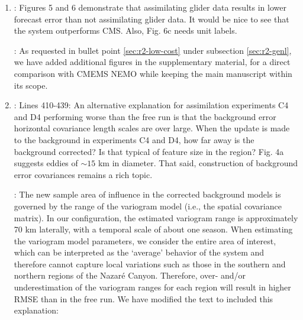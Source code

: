 \documentclass[a4paper]{article}
\begin{document}
\begin{answers}
\begin{enumerate}
\item

  \reply: Figures 5 and 6 demonstrate that assimilating glider data
  results in lower forecast error than not assimilating glider
  data. It would be nice to see that the system outperforms CMS. Also,
  Fig. 6c needs unit labels.

  \action: As requested in bullet point \ref{sec:r2-low-cost} under
  subsection \ref{sec:r2-genl}, we have added additional figures in
  the supplementary material, for a direct comparison with CMEMS NEMO
  while keeping the main manuscript within its scope.


\item\label{sec:r2-assim}

  \reply: Lines 410-439: An alternative explanation for assimilation
  experiments C4 and D4 performing worse than the free run is that the
  background error horizontal covariance length scales are over large.
  When the update is made to the background in experiments C4 and D4,
  how far away is the background corrected? Is that typical of feature
  size in the region? Fig. 4a suggests eddies of $\sim 15$ km in diameter.
  That said, construction of background error covariances remains a
  rich topic.

  \action: The new sample area of influence in the corrected
  background models is governed by the range of the variogram model
  (i.e., the spatial covariance matrix). In our configuration, the
  estimated variogram range is approximately 70 km laterally, with a
  temporal scale of about one season. When estimating the variogram
  model parameters, we consider the entire area of interest, which can
  be interpreted as the ‘average’ behavior of the system and therefore
  cannot capture local variations such as those in the southern and
  northern regions of the Nazar\'{e} Canyon. Therefore, over- and/or
  underestimation of the variogram ranges for each region will result
  in higher RMSE than in the free run. We have modified the text to
  included this explanation:

  \begin{quote}


\end{quote}
\end{enumerate}
\end{answers}
\end{document}
